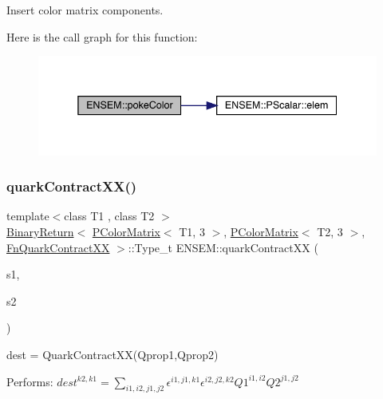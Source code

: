 Insert color matrix components. 

Here is the call graph for this function\+:\nopagebreak
\begin{figure}[H]
\begin{center}
\leavevmode
\includegraphics[width=338pt]{dd/d2f/group__primcolormatrix_ga83e068e757a42e9866992b38a003d7f9_cgraph}
\end{center}
\end{figure}
\mbox{\label{group__primcolormatrix_ga2253a81d9cf66ad41a9c2426ef5a8b84}} 
\subsubsection{\texorpdfstring{quarkContractXX()}{quarkContractXX()}\hspace{0.1cm}{\footnotesize\ttfamily [1/4]}}
{\footnotesize\ttfamily template$<$class T1 , class T2 $>$ \\
\mbox{\hyperlink{structENSEM_1_1BinaryReturn}{Binary\+Return}}$<$ \mbox{\hyperlink{classENSEM_1_1PColorMatrix}{P\+Color\+Matrix}}$<$ T1, 3 $>$, \mbox{\hyperlink{classENSEM_1_1PColorMatrix}{P\+Color\+Matrix}}$<$ T2, 3 $>$, \mbox{\hyperlink{structENSEM_1_1FnQuarkContractXX}{Fn\+Quark\+Contract\+XX}} $>$\+::Type\+\_\+t E\+N\+S\+E\+M\+::quark\+Contract\+XX (\begin{DoxyParamCaption}\item[{const \mbox{\hyperlink{classENSEM_1_1PColorMatrix}{P\+Color\+Matrix}}$<$ T1, 3 $>$ \&}]{s1,  }\item[{const \mbox{\hyperlink{classENSEM_1_1PColorMatrix}{P\+Color\+Matrix}}$<$ T2, 3 $>$ \&}]{s2 }\end{DoxyParamCaption})\hspace{0.3cm}{\ttfamily [inline]}}



dest = Quark\+Contract\+X\+X(\+Qprop1,\+Qprop2) 

Performs\+: $dest^{k2,k1} = \sum_{i1,i2,j1,j2} \epsilon^{i1,j1,k1}\epsilon^{i2,j2,k2} Q1^{i1,i2} Q2^{j1,j2}$


